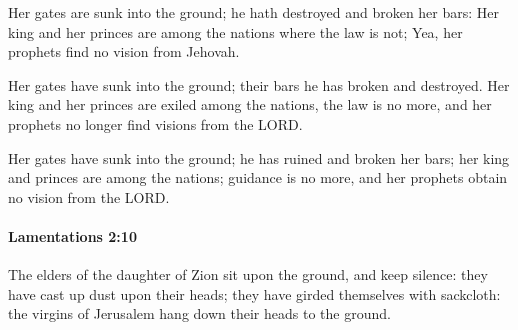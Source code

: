 			\begin{versebox}
					\item[BHS] 
					\item[LXX] 
					\item[ASV] Her gates are sunk into the ground; he hath destroyed and broken her bars: Her king and her princes are among the nations where the law is not; Yea, her prophets find no vision from Jehovah.
					\item[NIV] Her gates have sunk into the ground; their bars he has broken and destroyed. Her king and her princes are exiled among the nations, the law is no more, and her prophets no longer find visions from the LORD.
					\item[NRSV] Her gates have sunk into the ground; he has ruined and broken her bars; her king and princes are among the nations; guidance is no more, and her prophets obtain no vision from the LORD.
			\end{versebox}

		\paragraph{Lamentations 2:10} %
			\label{LAMENTATIONS-2-10}

			The elders of the daughter of Zion sit upon the ground, and keep silence: they have cast up dust upon their heads; they have girded themselves with sackcloth: the virgins of Jerusalem hang down their heads to the ground.

